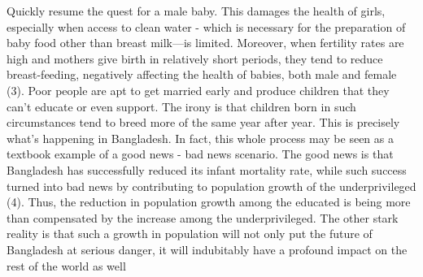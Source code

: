 \documentclass[a4paper,12pt]{article}
\begin{document}
Quickly resume the quest for a male baby. This damages the health of girls, especially when access to clean water - which is necessary for the preparation of baby food other than breast milk—is limited. Moreover, when fertility rates are high and mothers give birth in relatively short periods, they tend to reduce breast-feeding, negatively affecting the health of babies, both male and female (3).  Poor people are apt to get married early and produce children that they can’t educate or even support. The irony is that children born in such circumstances tend to breed more of the same year after year. This is precisely what’s happening in Bangladesh. In fact, this whole process may be seen as a textbook example of a good news - bad news scenario. The good news is that Bangladesh has successfully reduced its infant mortality rate, while such success turned into bad news by contributing to population growth of the underprivileged (4).   Thus, the reduction in population growth among the educated is being more than compensated by the increase among the underprivileged. The other stark reality is that such a growth in population will not only put the future of Bangladesh at serious danger, it will indubitably have a profound impact on the rest of the world as well
\end{document}
